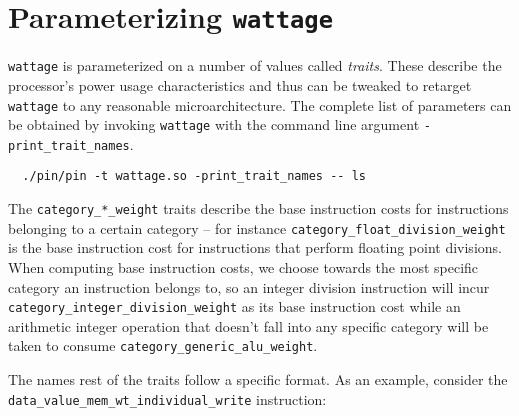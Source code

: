 
\chapter{Parameterizing \texttt{wattage}} %

\label{AppendixA}


\texttt{wattage} is parameterized on a number of values called
\textit{traits}.  These describe the processor's power usage
characteristics and thus can be tweaked to retarget \texttt{wattage}
to any reasonable microarchitecture.  The complete list of parameters
can be obtained by invoking \texttt{wattage} with the command line
argument \texttt{-print\_trait\_names}.

\begin{verbatim}
  ./pin/pin -t wattage.so -print_trait_names -- ls
\end{verbatim}

The \texttt{category\_*\_weight} traits describe the base instruction
costs for instructions belonging to a certain category -- for instance
\texttt{category\_float\_division\_weight} is the base instruction
cost for instructions that perform floating point divisions.  When
computing base instruction costs, we choose towards the most specific
category an instruction belongs to, so an integer division instruction
will incur \texttt{category\_integer\_division\_weight} as its base
instruction cost while an arithmetic integer operation that doesn't
fall into any specific category will be taken to consume
\texttt{category\_generic\_alu\_weight}.

The names rest of the traits follow a specific format.  As an example,
consider the \texttt{data\_value\_mem\_wt\_individual\_write} instruction:

